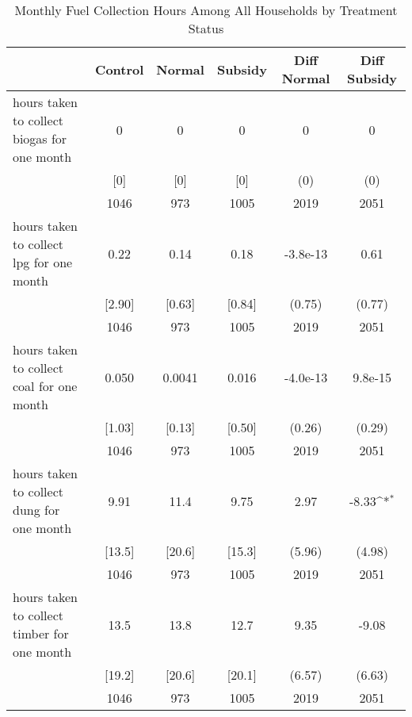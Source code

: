 \begin{table}[htbp]\centering
\def\sym#1{\ifmmode^{#1}\else\(^{#1}\)\fi}
\caption{Monthly Fuel Collection Hours Among All Households by Treatment Status \label{tab:"balance"}}
\begin{tabular*}{0.9\hsize}{@{\hskip\tabcolsep\extracolsep\fill}l*{1}{ccccc}}
\toprule
                                &  Control&   Normal&  Subsidy&Diff Normal         &Diff Subsidy         \\
\midrule
hours taken to collect biogas for one month&        0&        0&        0&        0         &        0         \\
                                &      [0]&      [0]&      [0]&      (0)         &      (0)         \\
                                &     1046&      973&     1005&     2019         &     2051         \\
hours taken to collect lpg for one month&     0.22&     0.14&     0.18& -3.8e-13         &     0.61         \\
                                &   [2.90]&   [0.63]&   [0.84]&   (0.75)         &   (0.77)         \\
                                &     1046&      973&     1005&     2019         &     2051         \\
hours taken to collect coal for one month&    0.050&   0.0041&    0.016& -4.0e-13         &  9.8e-15         \\
                                &   [1.03]&   [0.13]&   [0.50]&   (0.26)         &   (0.29)         \\
                                &     1046&      973&     1005&     2019         &     2051         \\
hours taken to collect dung for one month&     9.91&     11.4&     9.75&     2.97         &    -8.33\sym{*}  \\
                                &   [13.5]&   [20.6]&   [15.3]&   (5.96)         &   (4.98)         \\
                                &     1046&      973&     1005&     2019         &     2051         \\
hours taken to collect timber for one month&     13.5&     13.8&     12.7&     9.35         &    -9.08         \\
                                &   [19.2]&   [20.6]&   [20.1]&   (6.57)         &   (6.63)         \\
                                &     1046&      973&     1005&     2019         &     2051         \\

\end{tabular*}
\end{table}
